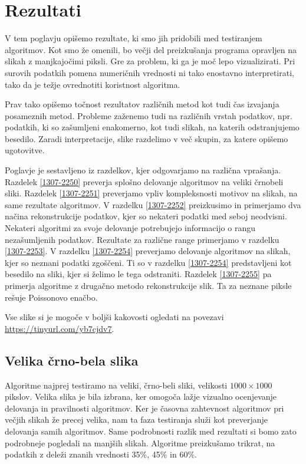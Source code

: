 \chapter{Rezultati}\label{1407-1012}

V tem poglavju opišemo rezultate, ki smo jih pridobili med testiranjem algoritmov. Kot smo že omenili, bo večji del preizkušanja programa opravljen na slikah z manjkajočimi piksli.
Gre za problem, ki ga je moč lepo vizualizirati.
Pri surovih podatkih pomena numeričnih vrednosti ni tako enostavno interpretirati, tako da je težje ovrednotiti koristnost algoritma.

Prav tako opišemo točnost rezultatov različnih metod kot tudi čas izvajanja posameznih metod. Probleme zaženemo tudi na različnih vrstah podatkov, npr. podatkih, ki so zašumljeni enakomerno, kot tudi slikah, na katerih odstranjujemo besedilo.
Zaradi interpretacije, slike razdelimo v več skupin, za katere opišemo ugotovitve.

Poglavje je sestavljeno iz razdelkov, kjer odgovarjamo na različna vprašanja. Razdelek \eqref{1307-2250} preverja splošno delovanje algoritmov na veliki črnobeli sliki. Razdelek \eqref{1307-2251} preverjamo vpliv kompleksnosti motivov na slikah, na same rezultate algoritmov. V razdelku \eqref{1307-2252} preizkusimo in primerjamo dva načina rekonstrukcije podatkov, kjer so nekateri podatki med seboj neodvisni. Nekateri algoritmi za svoje delovanje potrebujejo informacijo o rangu nezašumljenih podatkov. Rezultate za različne range primerjamo v razdelku \eqref{1307-2253}. V razdelku \eqref{1307-2254} preverjamo delovanje algoritmov na slikah, kjer so neznani podatki zgoščeni. Ti so v razdelku \eqref{1307-2254} predstavljeni kot besedilo na sliki, kjer si želimo le tega odstraniti. Razdelek \eqref{1307-2255} pa primerja algoritme z drugačno metodo rekonstrukcije slik. Ta za neznane piksle rešuje Poissonovo enačbo.


Vse slike si je mogoče v boljši kakovosti ogledati na povezavi \url{https://tinyurl.com/yb7cjdv7}.

\section{Velika črno-bela slika} \label{1307-2250}
Algoritme najprej testiramo na veliki, črno-beli sliki, velikosti $1000\times1000$ pikslov. Velika slika je bila izbrana, ker omogoča lažje vizualno ocenjevanje delovanja in pravilnosti algoritmov.
Ker je časovna zahtevnost algoritmov pri večjih slikah že precej velika, nam ta faza testiranja služi kot preverjanje delovanja samih algoritmov. Same podrobnosti razlik med rezultati si bomo zato podrobneje pogledali na manjših slikah. Algoritme preizkušamo trikrat, na podatkih z deleži znanih vrednosti 35\%, 45\%  in 60\%.

\FloatBarrier

